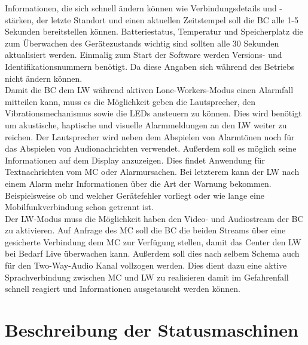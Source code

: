 \documentclass[thesis.tex]{subfiles}
\begin{document}
Informationen, die sich schnell ändern können wie Verbindungsdetails und -stärken, der letzte Standort und
einen aktuellen Zeitstempel soll die BC alle 1-5 Sekunden bereitstellen können.
Batteriestatus, Temperatur und Speicherplatz die zum Überwachen des Gerätezustands wichtig sind sollten alle 30 Sekunden aktualisiert werden.
Einmalig zum Start der Software werden Versions- und Identifikationsnummern benötigt.
Da diese Angaben sich während des Betriebs nicht ändern können.
\\

Damit die BC dem LW während aktiven Lone-Workers-Modus einen Alarmfall mitteilen kann,
muss es die Möglichkeit geben die Lautsprecher, den Vibrationsmechanismus sowie die LEDs ansteuern zu können.
Dies wird benötigt um akustische, haptische und visuelle Alarmmeldungen an den LW weiter zu reichen.
Der Lautsprecher wird neben dem Abspielen von Alarmtönen noch für das Abspielen von Audionachrichten verwendet.
Außerdem soll es möglich seine Informationen auf dem Display anzuzeigen.
Dies findet Anwendung für Textnachrichten vom MC oder Alarmursachen.
Bei letzterem kann der LW nach einem Alarm mehr Informationen über die Art der Warnung bekommen.
Beispielsweise ob und welcher Gerätefehler vorliegt oder wie lange eine Mobilfunkverbindung schon getrennt ist.
\\

Der LW-Modus muss die Möglichkeit haben den Video- und Audiostream der BC zu aktivieren.
Auf Anfrage des MC soll die BC die beiden Streams über eine gesicherte Verbindung dem MC zur Verfügung stellen,
damit das Center den LW bei Bedarf Live überwachen kann.
Außerdem soll dies nach selbem Schema auch für den Two-Way-Audio Kanal vollzogen werden.
Dies dient dazu eine aktive Sprachverbindung zwischen MC und LW zu realisieren damit im Gefahrenfall schnell reagiert
und Informationen ausgetauscht werden können.

\section{Beschreibung der Statusmaschinen}


\subfilebib %
\end{document}
